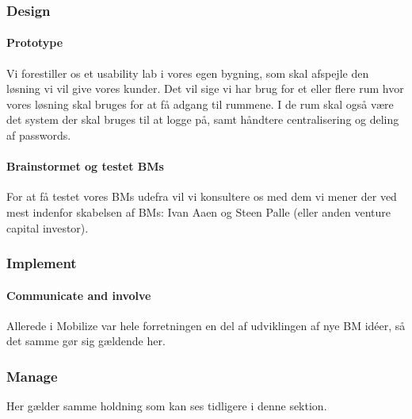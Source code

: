 \subsubsection{Design}
\paragraph{Prototype}
Vi forestiller os et usability lab i vores egen bygning, som skal afspejle den løsning vi vil give vores kunder.
Det vil sige vi har brug for et eller flere rum hvor vores løsning skal bruges for at få adgang til rummene.
I de rum skal også være det system der skal bruges til at logge på, samt håndtere centralisering og deling af passwords.

\paragraph{Brainstormet og testet BMs}
For at få testet vores BMs udefra vil vi konsultere os med dem vi mener der ved mest indenfor skabelsen af BMs: Ivan Aaen og Steen Palle (eller anden venture capital investor).

\subsubsection{Implement}
\paragraph{Communicate and involve}
Allerede i Mobilize var hele forretningen en del af udviklingen af nye BM idéer, så det samme gør sig gældende her.

\subsubsection{Manage}
Her gælder samme holdning som kan ses tidligere i denne sektion.
